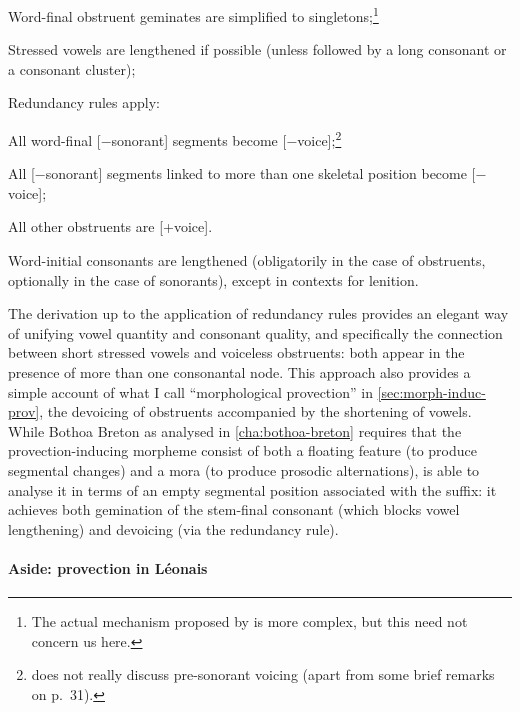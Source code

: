 \begin{enumerate*}
\item Word-final obstruent geminates are simplified to singletons;\footnote{The actual mechanism proposed by \citet{carlyle88:_breton} is more complex, but this need not concern us here.}
\item Stressed vowels are lengthened if possible (\ie unless followed by a long consonant or a consonant cluster);
\item Redundancy rules apply:
\begin{itemize*}
\item All word-final [$-$sonorant] segments become [$-$voice];\footnote{\citet{carlyle88:_breton} does not really discuss pre-sonorant voicing (apart from some brief remarks on p.~31).}
\item All [$-$sonorant] segments linked to more than one skeletal position become [$-$voice];
\item All other obstruents are [+voice].
\end{itemize*}
\item Word-initial consonants are lengthened (obligatorily in the case of obstruents, optionally in the case of sonorants), except in contexts for lenition.
\end{enumerate*}

The derivation up to the application of redundancy rules provides an elegant way of unifying vowel quantity and consonant quality, and specifically the connection between short stressed vowels and voiceless obstruents: both appear in the presence of more than one consonantal node. This approach also provides a simple account of what I call \enquote{morphological provection} in \cref{sec:morph-induc-prov}, \ie the devoicing of obstruents accompanied by the shortening of vowels. While Bothoa Breton as analysed in \cref{cha:bothoa-breton} requires that the provection\hyp inducing morpheme consist of both a floating  feature (to produce segmental changes) and a mora (to produce prosodic alternations), \citet{carlyle88:_breton} is able to analyse it in terms of an empty segmental position associated with the suffix: it achieves both gemination of the stem\hyp final consonant (which blocks vowel lengthening) and devoicing (via the redundancy rule).

\paragraph{Aside: provection in Léonais}
\label{sec:asid-prov-leon}

